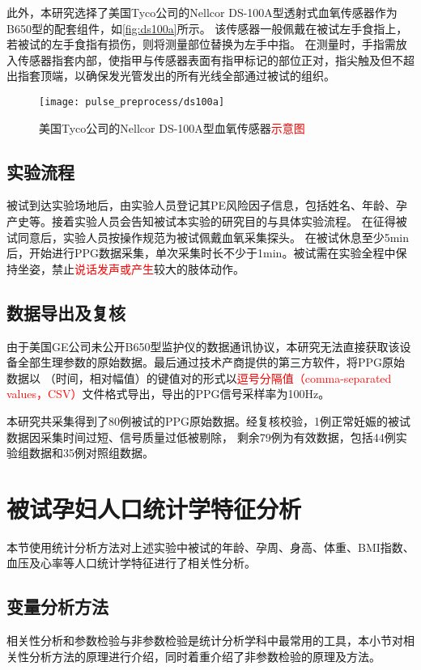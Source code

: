此外，本研究选择了美国Tyco公司的Nellcor DS-100A型透射式血氧传感器作为B650型的配套组件，如\autoref{fig:ds100a}所示。
该传感器一般佩戴在被试左手食指上，若被试的左手食指有损伤，则将测量部位替换为左手中指。
在测量时，手指需放入传感器指套内部，使指甲与传感器表面有指甲标记的部位正对，指尖触及但不超出指套顶端，以确保发光管发出的所有光线全部通过被试的组织。

\begin{figure}[htbp]
    \centering
    \texttt{[image: pulse\_preprocess/ds100a]}
    \caption{\label{fig:ds100a}美国Tyco公司的Nellcor DS-100A型血氧传感器\textcolor{red}{示意图}}
\end{figure}

\subsection{实验流程}
被试到达实验场地后，由实验人员登记其PE风险因子信息，包括姓名、年龄、孕产史等。接着实验人员会告知被试本实验的研究目的与具体实验流程。
在征得被试同意后，实验人员按操作规范为被试佩戴血氧采集探头\cite{Chen2021}。
在被试休息至少5min后，开始进行PPG数据采集，单次采集时长不少于1min。被试需在实验全程中保持坐姿，禁止\textcolor{red}{说话发声或产生}较大的肢体动作。

\subsection{数据导出及复核}
由于美国GE公司未公开B650型监护仪的数据通讯协议，本研究无法直接获取该设备全部生理参数的原始数据。最后通过技术产商提供的第三方软件，将PPG原始数据以
（时间，相对幅值）的键值对的形式以\textcolor{red}{逗号分隔值（comma-separated values，CSV）}文件格式导出，导出的PPG信号采样率为100Hz。

本研究共采集得到了80例被试的PPG原始数据。经复核校验，1例正常妊娠的被试数据因采集时间过短、信号质量过低被剔除，
剩余79例为有效数据，包括44例实验组数据和35例对照组数据。

\section{被试孕妇人口统计学特征分析}
本节使用统计分析方法对上述实验中被试的年龄、孕周、身高、体重、BMI指数、血压及心率等人口统计学特征进行了相关性分析。

\subsection{变量分析方法}
相关性分析和参数检验与非参数检验是统计分析学科中最常用的工具，本小节对相关性分析方法的原理进行介绍，同时着重介绍了非参数检验的原理及方法。


